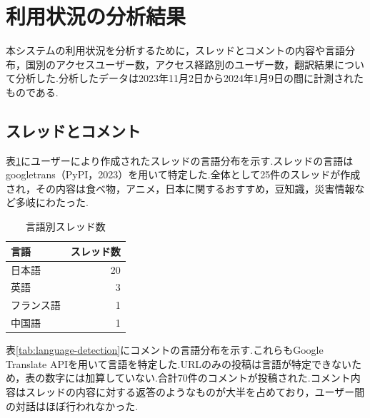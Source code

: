 \documentclass[b5paper,12pt,dvipdfmx]{jsreport}
\begin{document}
\section{利用状況の分析結果}

本システムの利用状況を分析するために，スレッドとコメントの内容や言語分布，国別のアクセスユーザー数，アクセス経路別のユーザー数，翻訳結果について分析した.分析したデータは2023年11月2日から2024年1月9日の間に計測されたものである.

\subsection{スレッドとコメント}

表\ref{tab:thread-language}にユーザーにより作成されたスレッドの言語分布を示す.スレッドの言語はgoogletrans（PyPI，2023）を用いて特定した.全体として25件のスレッドが作成され，その内容は食べ物，アニメ，日本に関するおすすめ，豆知識，災害情報など多岐にわたった.


\begin{table}[H]
    \centering
    \caption{言語別スレッド数}
    \label{tab:thread-language}
    \begin{tabular}{|l|r|}
        \hline
        \textbf{言語} & \textbf{スレッド数} \\ \hline
        日本語       & 20               \\
        英語         & 3                 \\
        フランス語    & 1                 \\
        中国語       & 1                 \\ \hline
    \end{tabular}
\end{table}

表\ref{tab:language-detection}にコメントの言語分布を示す.これらもGoogle Translate APIを用いて言語を特定した.URLのみの投稿は言語が特定できないため，表の数字には加算していない.合計70件のコメントが投稿された.コメント内容はスレッドの内容に対する返答のようなものが大半を占めており，ユーザー間の対話はほぼ行われなかった.
\end{document}
